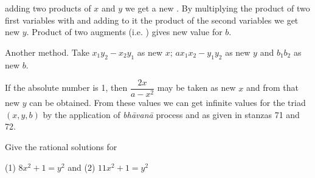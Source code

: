 \documentclass[]{article}
\begin{document}
{\newpage
\large

\noindent adding two products of $x$ and $y$ we get a new {}. By multiplying the product of two first variables with {} and adding to it the product of the second variables we get new $y$. Product of two augments (i.e. {}) gives new value for $b$.

Another method. Take $x_{1}y_{2} - x_{2}y_{1}$ as new $x; \,ax_{1}x_{2} - y_{1}y_{2}$ as new $y$ and $b_{1}b_{2}$ as new $b$.

\begin{quote}  {  }
\end{quote}

If the absolute number is 1, then $\dfrac{2x}{a-x^{2}}$ may be taken as new $x$ and from that new $y$ can be obtained. From these values we can get infinite values for the triad $(x, y, b)$ by the application of \textit{bhāvanā} process and {} as given in stanzas 71 and 72.

\begin{quote}  {
}  \end{quote}

{Give the rational solutions for}

(1) $8x^{2} + 1 = y^{2}$ and (2) $11x^{2} + 1 = y^{2}$

\begin{quote}  {}
\end{quote}}
\end{document}

